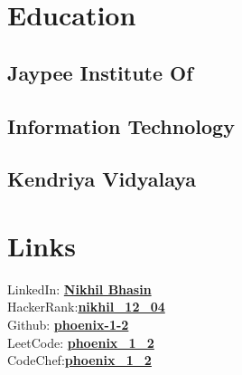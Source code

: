 \documentclass[]{deedy-resume-openfont}
\begin{document}
%
%


%
%

%
%

\begin{minipage}[t]{0.33\textwidth} 


\section{Education} 
\subsection{Jaypee Institute Of }
\subsection{Information Technology}
\sectionsep

\subsection{Kendriya Vidyalaya}



\section{Links} 
LinkedIn:  \href{https://www.linkedin.com/in/nikhil1204/}{\bf Nikhil Bhasin} \\
HackerRank:\href{https://www.hackerrank.com/nikhil_12_04}{\bf nikhil\_12\_04} \\
Github: \href{https://github.com/phoenix-1-2}{\bf phoenix-1-2} \\
LeetCode: \href{https://leetcode.com/phoenix_1_2/}{\bf phoenix\_1\_2} \\
CodeChef:\href{https://www.codechef.com/users/phoenix_1_2}{\bf phoenix\_1\_2} \\


\end{minipage}
\end{document}
